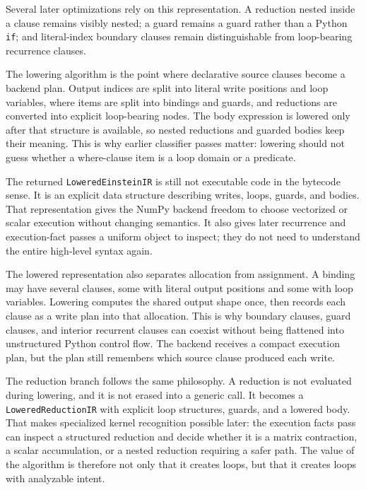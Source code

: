 Several later optimizations rely on this representation. A reduction nested
inside a clause remains visibly nested; a guard remains a guard rather than a
Python \texttt{if}; and literal-index boundary clauses remain distinguishable
from loop-bearing recurrence clauses.

The lowering algorithm is the point where declarative source clauses become a
backend plan. Output indices are split into literal write positions and loop
variables, where items are split into bindings and guards, and reductions are
converted into explicit loop-bearing nodes. The body expression is lowered only
after that structure is available, so nested reductions and guarded bodies keep
their meaning. This is why earlier classifier passes matter: lowering should
not guess whether a where-clause item is a loop domain or a predicate.

The returned \texttt{LoweredEinsteinIR} is still not executable code in the
bytecode sense. It is an explicit data structure describing writes, loops,
guards, and bodies. That representation gives the NumPy backend freedom to
choose vectorized or scalar execution without changing semantics. It also gives
later recurrence and execution-fact passes a uniform object to inspect; they do
not need to understand the entire high-level syntax again.

The lowered representation also separates allocation from assignment. A binding
may have several clauses, some with literal output positions and some with loop
variables. Lowering computes the shared output shape once, then records each
clause as a write plan into that allocation. This is why boundary clauses, guard
clauses, and interior recurrent clauses can coexist without being flattened into
unstructured Python control flow. The backend receives a compact execution plan,
but the plan still remembers which source clause produced each write.

The reduction branch follows the same philosophy. A reduction is not evaluated
during lowering, and it is not erased into a generic call. It becomes a
\texttt{LoweredReductionIR} with explicit loop structures, guards, and a lowered
body. That makes specialized kernel recognition possible later: the execution
facts pass can inspect a structured reduction and decide whether it is a matrix
contraction, a scalar accumulation, or a nested reduction requiring a safer
path. The value of the algorithm is therefore not only that it creates loops,
but that it creates loops with analyzable intent.

